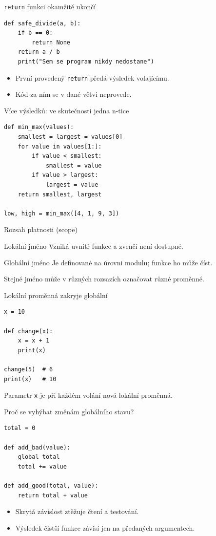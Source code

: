 \documentclass[aspectratio=169]{beamer}
\begin{document}
\begin{frame}[fragile]{\texttt{return} funkci okamžitě ukončí}
\begin{lstlisting}[style=python]
def safe_divide(a, b):
    if b == 0:
        return None
    return a / b
    print("Sem se program nikdy nedostane")
\end{lstlisting}
  \begin{itemize}
    \item První provedený \texttt{return} předá výsledek volajícímu.
    \item Kód za ním se v dané větvi neprovede.
  \end{itemize}
\end{frame}

\begin{frame}[fragile]{Více výsledků: ve skutečnosti jedna n-tice}
\begin{lstlisting}[style=python]
def min_max(values):
    smallest = largest = values[0]
    for value in values[1:]:
        if value < smallest:
            smallest = value
        if value > largest:
            largest = value
    return smallest, largest

low, high = min_max([4, 1, 9, 3])
\end{lstlisting}
\end{frame}

\begin{frame}{Rozsah platnosti (scope)}
  \begin{block}{Lokální jméno}
    Vzniká uvnitř funkce a zvenčí není dostupné.
  \end{block}
  \begin{block}{Globální jméno}
    Je definované na úrovni modulu; funkce ho může číst.
  \end{block}
  Stejné jméno může v různých rozsazích označovat různé proměnné.
\end{frame}

\begin{frame}[fragile]{Lokální proměnná zakryje globální}
\begin{lstlisting}[style=python]
x = 10

def change(x):
    x = x + 1
    print(x)

change(5)  # 6
print(x)   # 10
\end{lstlisting}
  Parametr \texttt{x} je při každém volání nová lokální proměnná.
\end{frame}

\begin{frame}[fragile]{Proč se vyhýbat změnám globálního stavu?}
\begin{lstlisting}[style=python]
total = 0

def add_bad(value):
    global total
    total += value

def add_good(total, value):
    return total + value
\end{lstlisting}
  \begin{itemize}
    \item Skrytá závislost ztěžuje čtení a testování.
    \item Výsledek čistší funkce závisí jen na předaných argumentech.
  \end{itemize}
\end{frame}
\end{document}
